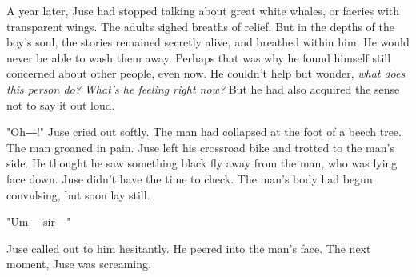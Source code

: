 A year later, Juse had stopped talking about great white whales, or
faeries with transparent wings. The adults sighed breaths of relief. But
in the depths of the boy's soul, the stories remained secretly alive,
and breathed within him. He would never be able to wash them away.
Perhaps that was why he found himself still concerned about other
people, even now. He couldn't help but wonder, \emph{what does this person do?
What's he feeling right now?} But he had also acquired the sense not to
say it out loud.

"Oh―!" Juse cried out softly. The man had collapsed at the foot of a
beech tree. The man groaned in pain. Juse left his crossroad bike and
trotted to the man's side. He thought he saw something black fly away
from the man, who was lying face down. Juse didn't have the time to
check. The man's body had begun convulsing, but soon lay still.

"Um― sir―"

Juse called out to him hesitantly. He peered into the man's face. The
next moment, Juse was screaming.
